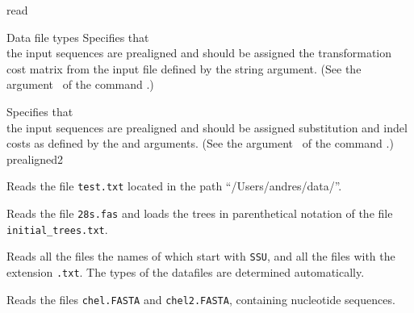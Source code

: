 \begin{command}{read}{}
\begin{arguments}
\begin{argumentgroup}{Data file types}
            {Specifies that \\ the input sequences are prealigned and
            should be assigned the transformation cost matrix from the 
            input file defined by the string argument. (See the argument~ 
            of the command .)}
            {}
        
            {Specifies that\\ the input sequences are prealigned and should be
            assigned substitution and indel costs as defined by the
             and  arguments. (See the argument~ 
            of the command .)}
            {prealigned2}

	\end{argumentgroup}
		
	\end{arguments}


	\begin{poyexamples}
	
            {Reads the file \texttt{test.txt} located in the path
            ``/Users/andres/data/''.}

            {Reads the file \texttt{28s.fas} and loads the trees in parenthetical notation
            of the file \texttt{initial\_trees.txt}.}

            {Reads all the files the names of which start with \texttt{SSU}, and all the
            files with the extension \texttt{.txt}. The types of the datafiles are determined
            automatically.}
        
            {Reads the files \texttt{chel.FASTA} and \texttt{chel2.FASTA}, containing nucleotide
            sequences.}


\end{poyexamples}
\end{command}
